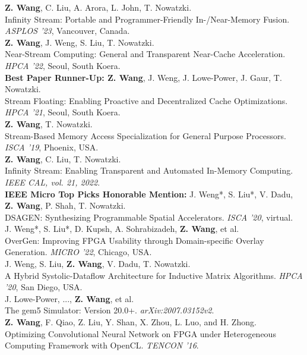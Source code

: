 \documentclass[a4paper]{article}
\newenvironment{changemargin}[2]{%
  \begin{list}{}{%
    \setlength{\topsep}{0pt}%
    \setlength{\leftmargin}{#1}%
    \setlength{\rightmargin}{#2}%
    \setlength{\listparindent}{\parindent}%
    \setlength{\itemindent}{\parindent}%
    \setlength{\parsep}{\parskip}%
  }%
  \item[]}{\end{list}
}
\newenvironment{body} {
	\vspace*{-16pt}
	\begin{changemargin}{-0.5in}{-0.5in}
  }	
	{\end{changemargin}
}
\begin{document}
\begin{body}
	\vspace{14pt}
	\textbf{Z. Wang}, C. Liu, A. Arora, L. John, T. Nowatzki. \\
    Infinity Stream: Portable and Programmer-Friendly In-/Near-Memory Fusion. \emph{ASPLOS '23}, Vancouver, Canada.\\
	\smallskip
	\textbf{Z. Wang}, J. Weng, S. Liu, T. Nowatzki. \\
	Near-Stream Computing: General and Transparent Near-Cache Acceleration. \emph{HPCA '22}, Seoul, South Koera.\\
	\smallskip
	\textbf{Best Paper Runner-Up: Z. Wang}, J. Weng, J. Lowe-Power, J. Gaur, T. Nowatzki. \\
	Stream Floating: Enabling Proactive and Decentralized Cache Optimizations. \emph{HPCA '21}, Seoul, South Koera.\\
	\smallskip
	\textbf{Z. Wang}, T. Nowatzki. \\
	Stream-Based Memory Access Specialization for General Purpose Processors. \emph{ISCA '19}, Phoenix, USA.\\
	\smallskip
	\textbf{Z. Wang}, C. Liu, T. Nowatzki. \\
    Infinity Stream: Enabling Transparent and Automated In-Memory Computing. \emph{IEEE CAL, vol. 21, 2022}.\\
	\smallskip
	\textbf{IEEE Micro Top Picks Honorable Mention:} J. Weng*, S. Liu*, V. Dadu, \textbf{Z. Wang}, P. Shah, T. Nowatzki. \\
	DSAGEN: Synthesizing Programmable Spatial Accelerators. \emph{ISCA '20}, virtual.\\
	\smallskip
	J. Weng*, S. Liu*, D. Kupsh, A. Sohrabizadeh, \textbf{Z. Wang}, et al. \\
	OverGen: Improving FPGA Usability through Domain-specific Overlay Generation. \emph{MICRO '22}, Chicago, USA.\\
	\smallskip
	J. Weng, S. Liu, \textbf{Z. Wang}, V. Dadu, T. Nowatzki. \\
	A Hybrid Systolic-Dataflow Architecture for Inductive Matrix Algorithms. \emph{HPCA '20}, San Diego, USA.\\
	\smallskip
	J. Lowe-Power, ..., \textbf{Z. Wang}, et al. \\
	The gem5 Simulator: Version 20.0+. \emph{arXiv:2007.03152v2}.\\
	\smallskip
	\textbf{Z. Wang}, F. Qiao, Z. Liu, Y. Shan, X. Zhou, L. Luo, and H. Zhong. \\
	Optimizing Convolutional Neural Network on FPGA under Heterogeneous Computing Framework with OpenCL. \emph{TENCON '16}.\\
\end{body}
\end{document}

